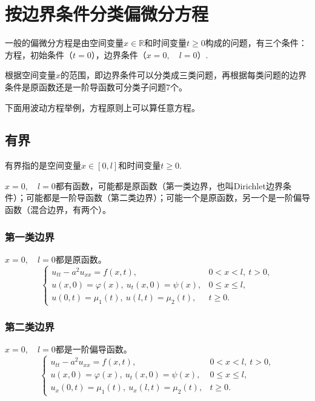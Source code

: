 \documentclass[12pt,a4paper]{article}
\newcommand{\R}{\mathbb{R}}
\numberwithin{subsection}{section}
\numberwithin{subsubsection}{subsection}
\theoremstyle{plain}
\theoremstyle{definition}
\theoremstyle{remark}
\begin{document}
	\pagestyle{mymain} %
	\section{按边界条件分类偏微分方程}
	一般的偏微分方程是由空间变量$x \in \R$和时间变量$t \geq 0$构成的问题，有三个条件：方程，初始条件（$t=0$），边界条件（$x=0, \quad l=0$）.
	  
	  根据空间变量$x$的范围，即边界条件可以分类成三类问题，再根据每类问题的边界条件是原函数还是一阶导函数可分类子问题7个。
	  
	  下面用波动方程举例，方程原则上可以算任意方程。
	\subsection{有界}
	有界指的是空间变量$x \in [0,l]$和时间变量$t \geq 0$.
	
	$x=0,\quad l=0$都有函数，可能都是原函数（第一类边界，也叫Dirichlet边界条件）；可能都是一阶导函数（第二类边界）；可能一个是原函数，另一个是一阶偏导函数（混合边界，有两个）。
	\subsubsection{第一类边界}
	$x=0,\quad l=0$都是原函数。
	\begin{equation}\label{The bounded wave equation with Dirichlet boundary conditions}
		\begin{cases}
			u_{tt} - a^2 u_{xx} = f(x, t), & 0 < x < l, \ t > 0, \\
			u(x, 0) = \varphi(x), \ u_t(x, 0) = \psi(x), & 0 \leq x \leq l, \\
			u(0, t) = \mu_1(t), \ u(l, t) = \mu_2(t), & t \geq 0.
		\end{cases}
	\end{equation}
		\subsubsection{第二类边界}
			$x=0,\quad l=0$都是一阶偏导函数。
		\begin{equation}\label{The bounded wave equation with Neumann boundary conditions}
			\begin{cases}
				u_{tt} - a^2 u_{xx} = f(x, t), & 0 < x < l, \ t > 0, \\
				u(x, 0) = \varphi(x), \ u_t(x, 0) = \psi(x), & 0 \leq x \leq l, \\
            	u_x(0, t) = \mu_1(t), \ u_x(l, t) = \mu_2(t), & t \geq 0.
			\end{cases}
		\end{equation}
		
\end{document}
